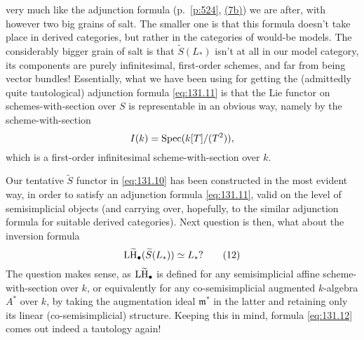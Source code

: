 very much like the adjunction formula (p.~\ref{p:524},
\hyperref[eq:124.7]{(7b)}) we are after, with however two big grains
of salt. The smaller one is that this formula doesn't take place in
derived categories, but rather in the categories of would-be
models. The considerably bigger grain of salt is that $\widetilde
S(L_*)$ isn't at all in our model category, its components are purely
infinitesimal, first-order schemes, and far from being vector bundles!
Essentially, what we have been using for getting the (admittedly quite
tautological) adjunction formula \eqref{eq:131.11} is that the Lie
functor on schemes-with-section over $S$ is representable in an
obvious way, namely by the scheme-with-section
\[I(k)=\operatorname{Spec}(k[T]/(T^2)),\]
which is a first-order infinitesimal scheme-with-section over $k$.

Our tentative $\widetilde S$ functor in \eqref{eq:131.10}
has been constructed in the most evident way, in order to satisfy an
adjunction formula \eqref{eq:131.11}, valid on the level of
semisimplicial objects (and carrying over, hopefully, to the similar
adjunction formula for suitable derived categories). Next question is
then, what about the inversion formula
\begin{equation}
  \label{eq:131.12}
  \operatorname{L\widetilde H}_\bullet( \widetilde S(L_*)) \simeq L_*\text{?}\tag{12}
\end{equation}
The question makes sense, as $\operatorname{L\widetilde H}_\bullet$ is defined for any
semisimplicial affine scheme-with-section over $k$, or equivalently
for any co-semisimplicial augmented $k$-algebra $A^*$ over $k$, by
taking the augmentation ideal $\mathfrak m^*$ in the latter and
retaining only its linear (co-semisimplicial) structure. Keeping this
in mind, formula \eqref{eq:131.12} comes out indeed a tautology again!

